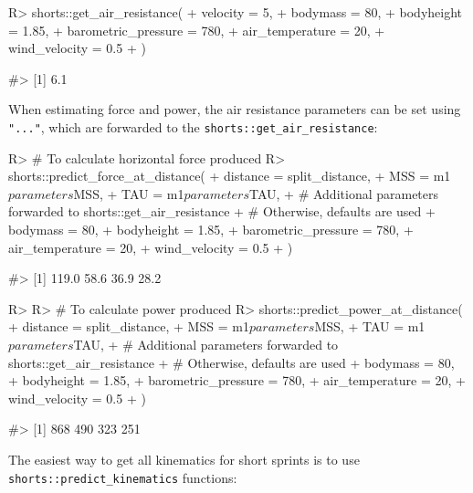 \documentclass[
]{jss}
\begin{document}
\begin{CodeChunk}
\begin{CodeInput}
R> shorts::get_air_resistance(
+   velocity = 5,
+   bodymass = 80,
+   bodyheight = 1.85,
+   barometric_pressure = 780,
+   air_temperature = 20,
+   wind_velocity = 0.5
+ )
\end{CodeInput}
\begin{CodeOutput}
#> [1] 6.1
\end{CodeOutput}
\end{CodeChunk}

When estimating force and power, the air resistance parameters can be set using \texttt{"..."}, which are forwarded to the \texttt{shorts::get\_air\_resistance}:

\begin{CodeChunk}
\begin{CodeInput}
R> # To calculate horizontal force produced
R> shorts::predict_force_at_distance(
+   distance = split_distance,
+   MSS = m1$parameters$MSS,
+   TAU = m1$parameters$TAU,
+   # Additional parameters forwarded to shorts::get_air_resistance
+   # Otherwise, defaults are used
+   bodymass = 80,
+   bodyheight = 1.85,
+   barometric_pressure = 780,
+   air_temperature = 20,
+   wind_velocity = 0.5
+ )
\end{CodeInput}
\begin{CodeOutput}
#> [1] 119.0  58.6  36.9  28.2
\end{CodeOutput}
\begin{CodeInput}
R> 
R> # To calculate power produced
R> shorts::predict_power_at_distance(
+   distance = split_distance,
+   MSS = m1$parameters$MSS,
+   TAU = m1$parameters$TAU,
+   # Additional parameters forwarded to shorts::get_air_resistance
+   # Otherwise, defaults are used
+   bodymass = 80,
+   bodyheight = 1.85,
+   barometric_pressure = 780,
+   air_temperature = 20,
+   wind_velocity = 0.5
+ )
\end{CodeInput}
\begin{CodeOutput}
#> [1] 868 490 323 251
\end{CodeOutput}
\end{CodeChunk}

The easiest way to get all kinematics for short sprints is to use \texttt{shorts::predict\_kinematics} functions:
\end{document}

